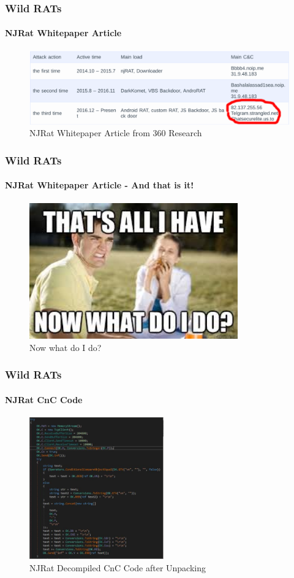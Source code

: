 \documentclass[aspectratio=169]{beamer}
\begin{document}
\begin{frame}
  \frametitle{Wild RATs}
  \framesubtitle{NJRat Whitepaper Article}
  \begin{center}
    \begin{figure}
      \includegraphics[width=12cm,keepaspectratio]{njrat_article}
      \caption{NJRat Whitepaper Article from 360 Research}
    \end{figure}
  \end{center}
\end{frame}

\begin{frame}
  \frametitle{Wild RATs}
  \framesubtitle{NJRat Whitepaper Article - And that is it!}
  \begin{center}
    \begin{figure}
      \includegraphics[width=9cm,keepaspectratio]{now_what_do_i_do}
      \caption{Now what do I do?}
    \end{figure}
  \end{center}
\end{frame}

\begin{frame}
  \frametitle{Wild RATs}
  \framesubtitle{NJRat CnC Code}
  \begin{center}
    \begin{figure}
      \includegraphics[width=5.8cm,keepaspectratio]{njrat_cnc}
      \caption{NJRat Decompiled CnC Code after Unpacking}
    \end{figure}
  \end{center}
\end{frame}
\end{document}
